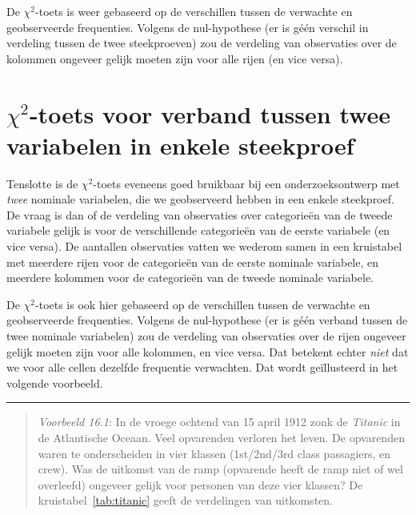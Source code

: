 \documentclass[
]{book}
\begin{document}
De \(\chi^2\)-toets is weer gebaseerd op de verschillen tussen de verwachte en
geobserveerde frequenties. Volgens de nul-hypothese (er is géén verschil
in verdeling tussen de twee steekproeven) zou de verdeling van
observaties over de kolommen ongeveer gelijk moeten zijn voor alle rijen
(en vice versa).

\hypertarget{chi2-toets-voor-verband-tussen-twee-variabelen-in-enkele-steekproef}{%
\section{\texorpdfstring{\(\chi^2\)-toets voor verband tussen twee variabelen in enkele steekproef}{\textbackslash chi\^{}2-toets voor verband tussen twee variabelen in enkele steekproef}}\label{chi2-toets-voor-verband-tussen-twee-variabelen-in-enkele-steekproef}}

Tenslotte is de \(\chi^2\)-toets eveneens goed bruikbaar bij een onderzoeksontwerp met
\emph{twee} nominale variabelen, die we geobserveerd hebben in een enkele
steekproef. De vraag is dan of de verdeling van observaties over
categorieën van de tweede variabele gelijk is voor de verschillende
categorieën van de eerste variabele (en vice versa). De aantallen
observaties vatten we wederom samen in een kruistabel met meerdere rijen
voor de categorieën van de eerste nominale variabele, en meerdere
kolommen voor de categorieën van de tweede nominale variabele.

De \(\chi^2\)-toets is ook hier gebaseerd op de verschillen tussen de verwachte en
geobserveerde frequenties. Volgens de nul-hypothese (er is géén verband
tussen de twee nominale variabelen) zou de verdeling van observaties
over de rijen ongeveer gelijk moeten zijn voor alle kolommen, en vice
versa. Dat betekent echter \emph{niet} dat we voor alle cellen dezelfde
frequentie verwachten. Dat wordt geïllusteerd in het volgende voorbeeld.

\begin{center}\rule{0.5\linewidth}{0.5pt}\end{center}

\begin{quote}
\emph{Voorbeeld 16.1}: In de vroege ochtend
van 15 april 1912 zonk de \emph{Titanic} in de Atlantische Oceaan. Veel
opvarenden verloren het leven. De opvarenden waren te onderscheiden in
vier klassen (1st/2nd/3rd class passagiers, en crew). Was de uitkomst
van de ramp (opvarende heeft de ramp niet of wel overleefd) ongeveer gelijk voor personen van
deze vier klassen? De kruistabel~\ref{tab:titanic} geeft de verdelingen van uitkomsten.
\end{quote}
\end{document}

